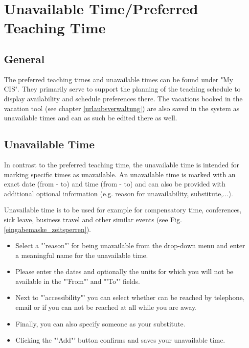 \chapter{Unavailable Time/Preferred Teaching Time}
\label{zeitsperren_zeitwuensche}

\section{General}

The preferred teaching times and unavailable times can be found under "My CIS".
They primarily serve to support the planning of the teaching schedule to display availability and schedule preferences there.
The vacations booked in the vacation tool (see chapter \ref{urlaubsverwaltung}) are also saved in the system as unavailable times and can as such be edited there as well.

\section{Unavailable Time}
\label{zeitsperren}

In contrast to the preferred teaching time, the unavailable time is intended for marking specific times as unavailable.
An unavailable time is marked with an exact date (from - to) and time (from - to) and can also be provided with additional optional information (e.g. reason for unavailability, substitute,...).

Unavailable time is to be used for example for compensatory time, conferences, sick leave, business travel and other similar events (see Fig. \ref{eingabemaske_zeitsperren}).

\begin{itemize}
	\item Select a "'reason"' for being unavailable from the drop-down menu and enter a meaningful name for the unavailable time.
	\item Please enter the dates and optionally the units for which you will not be available in the "'From"' and "'To"' fields.
	\item Next to "'accessibility"' you can select whether can be reached by telephone, email or if you can not be reached at all while you are away.
	\item Finally, you can also specify someone as your substitute.
	\item Clicking the "'Add"' button confirms and saves your unavailable time.	
\end{itemize}

